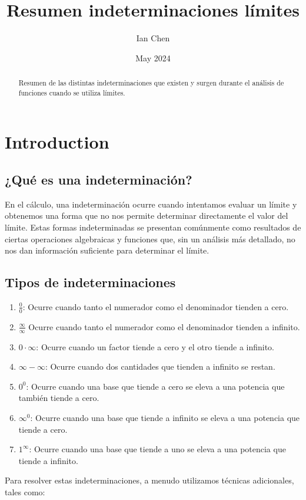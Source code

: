 \documentclass[12pt, a4paper]{article}
\title{Resumen indeterminaciones límites}
\author{Ian Chen}
\date{May 2024}
\begin{document}
\maketitle
\begin{abstract}
Resumen de las distintas indeterminaciones que existen y surgen durante  el análisis de funciones cuando se utiliza límites.
\end{abstract}
\vspace{1cm}
\tableofcontents
\newpage

\section{Introduction}
\subsection{¿Qué es una indeterminación?}
En el cálculo, una indeterminación ocurre cuando intentamos evaluar un límite y obtenemos una forma que no nos permite determinar directamente el valor del límite. Estas formas indeterminadas se presentan comúnmente como resultados de ciertas operaciones algebraicas y funciones que, sin un análisis más detallado, no nos dan información suficiente para determinar el límite.

\subsection{Tipos de indeterminaciones}
\begin{enumerate}
    \item \textbf{$\displaystyle \frac{0}{0}$}: Ocurre cuando tanto el numerador como el denominador tienden a cero.
    \item $\displaystyle \frac{\infty}{\infty}$ Ocurre cuando tanto el numerador como el denominador tienden a infinito.
    \item $\displaystyle 0 \cdot \infty$: Ocurre cuando un factor tiende a cero y el otro tiende a infinito.
    \item $\displaystyle \infty - \infty$: Ocurre cuando dos cantidades que tienden a infinito se restan.
    \item $\displaystyle 0^0$: Ocurre cuando una base que tiende a cero se eleva a una potencia que también tiende a cero.
    \item $\displaystyle \infty^0$: Ocurre cuando una base que tiende a infinito se eleva a una potencia que tiende a cero.
    \item $\displaystyle 1^\infty$: Ocurre cuando una base que tiende a uno se eleva a una potencia que tiende a infinito.
\end{enumerate}
Para resolver estas indeterminaciones, a menudo utilizamos técnicas adicionales, tales como:
\end{document}
